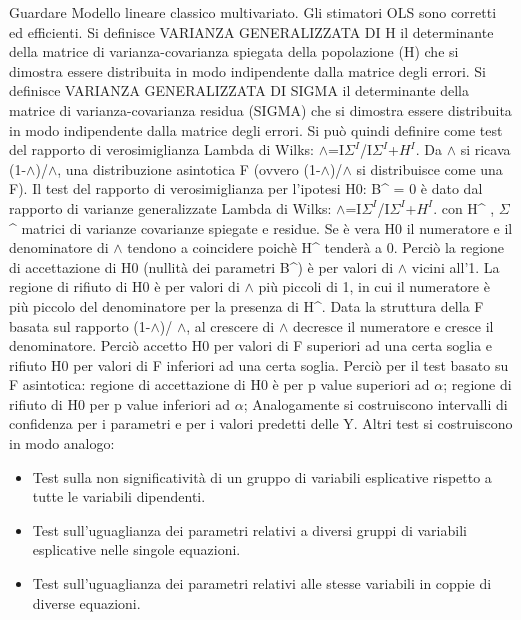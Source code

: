 \documentclass[a4page, 11pt]{article}
\begin{document}
Guardare Modello lineare classico multivariato.
\newline
Gli stimatori OLS sono corretti ed efficienti. 
\newline
Si definisce VARIANZA GENERALIZZATA DI H il determinante della matrice di varianza-covarianza spiegata della popolazione (H) che si dimostra essere distribuita in modo indipendente dalla matrice degli errori.
\newline
Si definisce VARIANZA GENERALIZZATA DI SIGMA il determinante della matrice di varianza-covarianza residua (SIGMA) che si dimostra essere distribuita in modo indipendente dalla matrice degli errori.
\newline
Si può quindi definire come test del rapporto di verosimiglianza Lambda di Wilks: 
$\wedge$=I$\Sigma^{I}$/I$\Sigma^{I}$+$H^{I}$. Da $\wedge$ si ricava (1-$\wedge$)/$\wedge$, una distribuzione asintotica F (ovvero (1-$\wedge$)/$\wedge$ si distribuisce come una F).
\newline
Il test del rapporto di verosimiglianza per l’ipotesi H0: B\string^ = 0 è dato dal rapporto di varianze generalizzate Lambda di Wilks: $\wedge$=I$\Sigma^{I}$/I$\Sigma^{I}$+$H^{I}$. con H\string^ , $\Sigma$\string^ matrici di varianze covarianze spiegate e residue.
\newline
Se è vera H0 il numeratore e il denominatore di $\wedge$ tendono a coincidere poichè H\string^ tenderà a 0. Perciò la regione di accettazione di H0 (nullità dei parametri B\string^) è per valori di $\wedge$ vicini all’1.
\newline
La regione di rifiuto di H0 è per valori di $\wedge$ più piccoli di 1, in cui il numeratore è più piccolo del denominatore per la presenza di H\string^.
Data la struttura della F basata sul rapporto (1-$\wedge$)/ $\wedge$, al crescere di $\wedge$ decresce il numeratore e cresce il denominatore.
Perciò accetto H0 per valori di F superiori ad una certa soglia e rifiuto H0 per valori di F inferiori ad una certa soglia.
\newline
Perciò per il test basato su F asintotica:
regione di accettazione di H0 è per p value superiori ad $\alpha$;
regione di rifiuto di H0 per p value inferiori ad $\alpha$;
Analogamente si costruiscono intervalli di confidenza per i parametri e per i valori predetti delle Y.
\newline
Altri test si costruiscono in modo analogo:
\begin{itemize}[noitemsep]
\item Test sulla non significatività di un gruppo di variabili esplicative rispetto a tutte le variabili dipendenti.
\item Test sull’uguaglianza dei parametri relativi a diversi gruppi di variabili esplicative nelle singole equazioni.
\item Test sull'uguaglianza dei parametri relativi alle stesse variabili in coppie di diverse equazioni.
\end{itemize}
\end{document}
